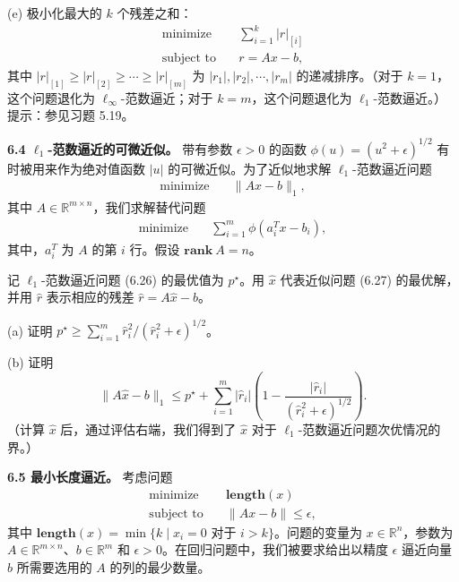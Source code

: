 \documentclass[UTF8, 12pt, fontset=fandol, oneside]{ctexart}
\begin{document}
(e) 极小化最大的 $k$ 个残差之和：
\[
\begin{aligned}
\text{minimize}\quad & \sum_{i=1}^k |r|_{[i]}\\
\text{subject to}\quad & r=Ax-b,
\end{aligned}
\]
其中 $|r|_{[1]}\geq |r|_{[2]}\geq \cdots\geq |r|_{[m]}$ 为 $|r_1|,|r_2|,\cdots,|r_m|$ 的递减排序。（对于 $k=1$，这个问题退化为 $\ell_\infty$-范数逼近；对于 $k=m$，这个问题退化为 $\ell_1$-范数逼近。）提示：参见习题 5.19。

\noindent\textbf{6.4 $\ell_1$-范数逼近的可微近似。}\quad
带有参数 $\epsilon>0$ 的函数 $\phi(u)=(u^2+\epsilon)^{1/2}$ 有时被用来作为绝对值函数 $|u|$ 的可微近似。为了近似地求解 $\ell_1$-范数逼近问题
\begin{equation}
\begin{aligned}
\text{minimize}\quad & \|Ax-b\|_1,
\end{aligned}
\tag{6.26}
\end{equation}
其中 $A\in\mathbb{R}^{m\times n}$，我们求解替代问题
\begin{equation}
\begin{aligned}
\text{minimize}\quad & \sum_{i=1}^m \phi(a_i^Tx-b_i),
\end{aligned}
\tag{6.27}
\end{equation}
其中，$a_i^T$ 为 $A$ 的第 $i$ 行。假设 $\mathbf{rank}\ A=n$。

记 $\ell_1$-范数逼近问题 (6.26) 的最优值为 $p^\star$。用 $\hat{x}$ 代表近似问题 (6.27) 的最优解，并用 $\hat{r}$ 表示相应的残差 $\hat{r}=A\hat{x}-b$。

(a) 证明 $p^\star\geq \sum_{i=1}^m \hat{r}_i^2/(\hat{r}_i^2+\epsilon)^{1/2}$。

(b) 证明
\[
\|A\hat{x}-b\|_1\leq p^\star+\sum_{i=1}^m |\hat{r}_i|\left(1-\frac{|\hat{r}_i|}{(\hat{r}_i^2+\epsilon)^{1/2}}\right).
\]
（计算 $\hat{x}$ 后，通过评估右端，我们得到了 $\hat{x}$ 对于 $\ell_1$-范数逼近问题次优情况的界。）

\noindent\textbf{6.5 最小长度逼近。}\quad
考虑问题
\[
\begin{aligned}
\text{minimize}\quad & \mathbf{length}(x)\\
\text{subject to}\quad & \|Ax-b\|\leq \epsilon,
\end{aligned}
\]
其中 $\mathbf{length}(x)=\min\{k\mid x_i=0\text{ 对于 }i>k\}$。问题的变量为 $x\in\mathbb{R}^n$，参数为 $A\in\mathbb{R}^{m\times n}$、$b\in\mathbb{R}^m$ 和 $\epsilon>0$。在回归问题中，我们被要求给出以精度 $\epsilon$ 逼近向量 $b$ 所需要选用的 $A$ 的列的最少数量。
\end{document}
